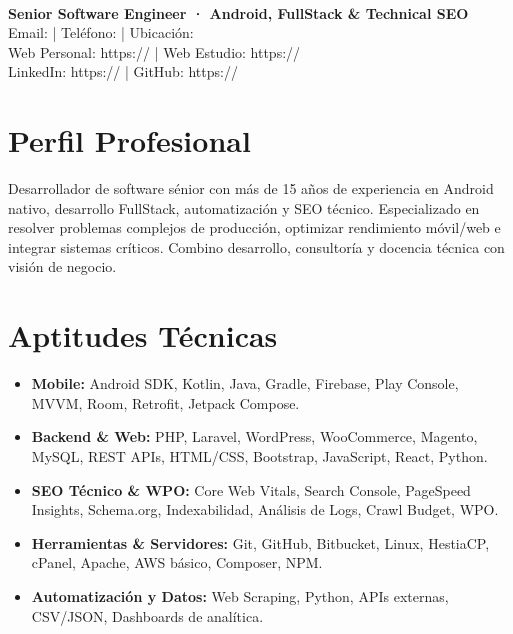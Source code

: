 \documentclass[10pt,a4paper]{article}
\begin{document}
\begin{center}
  {\Huge\bfseries \myname} \\
  \vspace{0.4em}
  {\large\bfseries Senior Software Engineer · Android, FullStack \& Technical SEO} \\
  \vspace{0.6em}
  Email: \myemail{} | Teléfono: \myphone{} | Ubicación: \mylocation{} \\
  Web Personal: https://\myweb{} | Web Estudio: https://\mywebwalkiria{} \\
  LinkedIn: https://\mylinkedin{} | GitHub: https://\mygithub{}
\end{center}

\vspace{0.6em}

\section{Perfil Profesional}
Desarrollador de software sénior con más de 15 años de experiencia en Android nativo, desarrollo FullStack, automatización y SEO técnico. Especializado en resolver problemas complejos de producción, optimizar rendimiento móvil/web e integrar sistemas críticos. Combino desarrollo, consultoría y docencia técnica con visión de negocio.

\section{Aptitudes Técnicas}
\begin{itemize}
  \item \textbf{Mobile:} Android SDK, Kotlin, Java, Gradle, Firebase, Play Console, MVVM, Room, Retrofit, Jetpack Compose.
  \item \textbf{Backend \& Web:} PHP, Laravel, WordPress, WooCommerce, Magento, MySQL, REST APIs, HTML/CSS, Bootstrap, JavaScript, React, Python.
  \item \textbf{SEO Técnico \& WPO:} Core Web Vitals, Search Console, PageSpeed Insights, Schema.org, Indexabilidad, Análisis de Logs, Crawl Budget, WPO.
  \item \textbf{Herramientas \& Servidores:} Git, GitHub, Bitbucket, Linux, HestiaCP, cPanel, Apache, AWS básico, Composer, NPM.
  \item \textbf{Automatización y Datos:} Web Scraping, Python, APIs externas, CSV/JSON, Dashboards de analítica.
\end{itemize}
\end{document}
